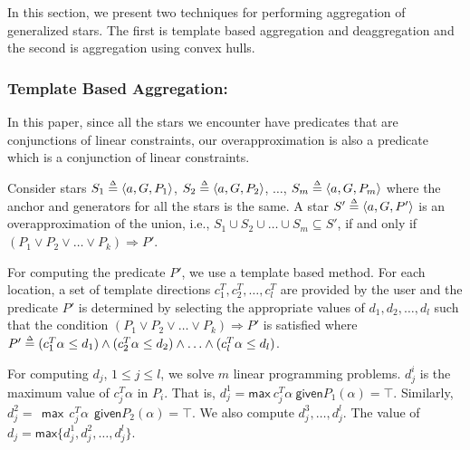 In this section, we present two techniques for performing aggregation of generalized stars. The first is template based aggregation and deaggregation and the second is aggregation using convex hulls.
%


\subsubsection{Template Based Aggregation:}
\label{sec:templateAgg}
In this paper, since all the stars we encounter have predicates that are conjunctions of linear constraints, our overapproximation is also a predicate which is a conjunction of linear constraints. 

\begin{lemma}
\label{lem:agg}
Consider stars $S_1 \deq \tup{a, G, P_1}$, $S_2 \deq \tup{a, G, P_2}$, $\ldots$, $S_m \deq \tup{a, G, P_m}$ where the anchor and generators for all the stars is the same.
%
A star $S' \deq \tup{a, G, P'}$ is an overapproximation of the union, i.e., $S_1 \cup S_2 \cup \ldots \cup S_m \subseteq S'$, if and only if $(P_1 \vee P_2 \vee \ldots \vee P_k) \Rightarrow P'$.
\end{lemma}

 For computing the predicate $P'$, we use a template based method.
%
%
For each location, a set of template directions $c_1^{T}, c_2^{T}, \ldots, c_{l}^{T}$ are provided by the user and the predicate $P'$ is determined by selecting the appropriate values of $d_1, d_2, \ldots, d_l$ such that the condition $(P_1 \vee P_2 \vee \ldots \vee P_k) \Rightarrow P'$ is satisfied where $P' \mathrel{\stackrel{\scriptscriptstyle\Delta}{=}} (c_1^{T}\alpha \leq d_1) \wedge (c_2^{T}\alpha \leq d_2) \wedge \ldots \wedge (c_l^{T}\alpha \leq d_l)$. 

For computing $d_j$, $1 \leq j \leq l$, we solve $m$ linear programming problems. $d_j^i$ is the maximum value of $c_j^T \alpha$ in $P_i$. That is, $d_j^1 = \mathsf{max}~ c_j^T \alpha~ \mathsf{given} P_1(\alpha) = \top$. Similarly, $d_j^2 = ~~\mathsf{max}~~ c_j^T \alpha~~ \mathsf{given} P_2(\alpha) = \top$. We also compute $d_j^3, \ldots, d_j^l$. The value of $d_j = \mathsf{max} \{d_j^1, d_j^2, \ldots, d_j^l\}$.

